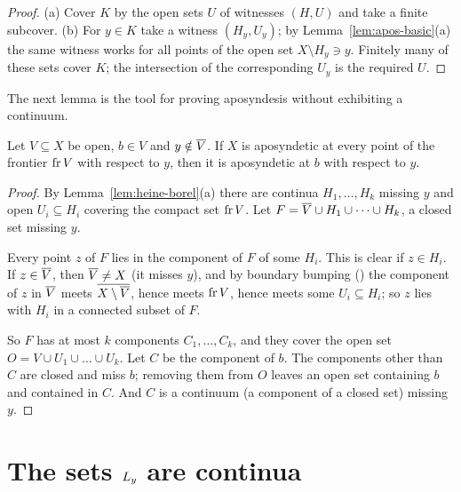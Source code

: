\begin{proof}
(a) Cover $K$ by the open sets $U$ of witnesses $(H,U)$ and take a finite subcover. (b) For $y\in K$ take a
witness $(H_y,U_y)$; by Lemma~\ref{lem:apos-basic}(a) the same witness works for all points of the open set
$X\setminus H_y\ni y$. Finitely many of these sets cover $K$; the intersection of the corresponding $U_y$
is the required $U$.
\end{proof}


The next lemma is the tool for proving aposyndesis without exhibiting a continuum.

\begin{lemma}\label{lem:apos-frontier}
Let $V\subseteq X$ be open, $b\in V$ and $y\notin\overline{V}$. If $X$ is aposyndetic at every point of the
frontier $\operatorname{fr} V$ with respect to $y$, then it is aposyndetic at $b$ with respect to $y$.
\end{lemma}

\begin{proof}
By Lemma~\ref{lem:heine-borel}(a) there are continua $H_1,\dots,H_k$ missing $y$ and open $U_i\subseteq H_i$
covering the compact set $\operatorname{fr} V$. Let $F=\overline{V}\cup H_1\cup\dots\cup H_k$, a closed set missing $y$.

Every point $z$ of $F$ lies in the component of $F$ of some $H_i$. This is clear if $z\in H_i$. If $z\in\overline{V}$, then $\overline{V}\ne X$ (it misses $y$), and by boundary bumping () the component of $z$
in $\overline{V}$ meets $\overline{X\setminus\overline{V}}$, hence meets $\operatorname{fr} V$, hence meets some $U_i\subseteq H_i$; so $z$
lies with $H_i$ in a connected subset of $F$.

So $F$ has at most $k$ components $C_1,\dots,C_k$, and they cover the open set $O=V\cup U_1\cup\dots\cup U_k$.
Let $C$ be the component of $b$. The components other than $C$ are closed and miss $b$; removing them from
$O$ leaves an open set containing $b$ and contained in $C$. And $C$ is a continuum (a component of a
closed set) missing $y$.
\end{proof}


\section{The sets \texorpdfstring{$L_{y}$}{L\_y} are continua}

